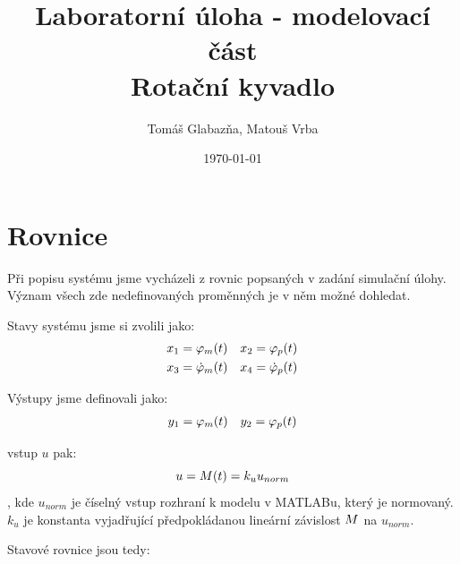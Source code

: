 \documentclass[11pt,a4paper]{article}
\title{%
  Laboratorní úloha - modelovací část\\
  \large Rotační kyvadlo}
\author{Tomáš Glabazňa, Matouš Vrba}
\date{\today}
\begin{document}
\maketitle

\clearpage





\section{Rovnice}
\renewcommand{\u}{u}
\newcommand{\x}[2][]{ %
  \ifstrequal{#1}{t} %
   	{x_{#2}(t)} %
    {x_{#2}}    %
}
\newcommand{\xd}[2][]{
  \ifstrequal{#1}{t} 
   	{\dot{x}_{#2}(t)}
    {\dot{x}_{#2}}
}
\newcommand{\y}[1]{y_{#1}}
\newcommand{\M}[1][]{
	\ifstrequal{#1}{t}
	{M(t)}
	{M}
}
\newcommand{\ku}{k_{u}}
\newcommand{\un}{u_{norm}}
\newcommand{\phid}[2][]{
	\ifstrequal{#1}{t}
	{\dot{\varphi}_{#2}(t)}
	{\dot{\varphi}_{#2}}
	}
\newcommand{\phidd}[1]{\ddot{\varphi}_{#1}}
\newcommand{\phin}[2][]{ %
	\ifstrequal{#1}{t}	
	{\varphi_{#2}(t)}
	{\varphi_{#2}}
	}
\newcommand{\coss}[1]{\cos{(#1)}}
\newcommand{\sinn}[1]{\sin{(#1)}}
\newcommand{\sinnN}[1]{\sin^2{(#1)}} %

Při popisu systému jsme vycházeli z rovnic popsaných v zadání simulační úlohy. Význam všech zde nedefinovaných proměnných je v něm možné dohledat.

Stavy systému jsme si zvolili jako:
\begin{align*}
& \x{1} = \phin[t]{m}		 && 		\x{2} = \phin[t]{p} \\
& \x{3} = \phid[t]{m}		 &&		\x{4} = \phid[t]{p} \\
\end{align*}

Výstupy jsme definovali jako:
\begin{align*}
& \y{1} = \phin[t]{m}		 &&		\y{2} = \phin[t]{p} \\
\end{align*}

vstup $\u$ pak:
$$
\u = \M[t] = \ku \un
$$
, kde $\un$ je číselný vstup rozhraní k modelu v MATLABu, který je normovaný. $k_u$ je konstanta vyjadřující předpokládanou lineární závislost $\M$ na $\un$.

Stavové rovnice jsou tedy:
\end{document}
